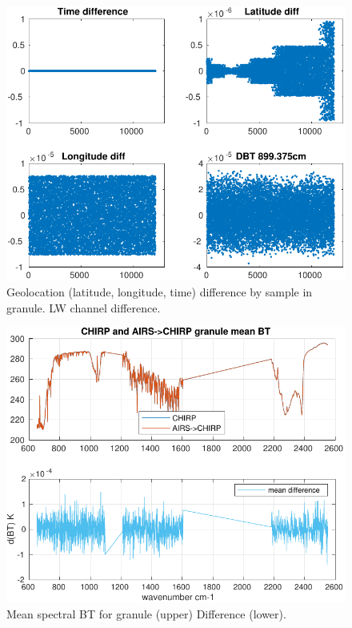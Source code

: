 \documentclass[11pt]{article}
\begin{document}
\begin{figure}[htbp]
\centering
\includegraphics[width=.9\linewidth]{./figs/2020d001g235_chirp_aq_geo_diff.pdf}
\caption{\label{fig:org7d36680}
Geolocation (latitude, longitude, time) difference by sample in granule. LW channel difference.}
\end{figure}

\begin{figure}[htbp]
\centering
\includegraphics[width=.9\linewidth]{./figs/2020d001g235_chirp_aq_bt_spectrum_mean.pdf}
\caption{\label{fig:orgc712f95}
Mean spectral BT for granule (upper) Difference (lower).}
\end{figure}
\end{document}
